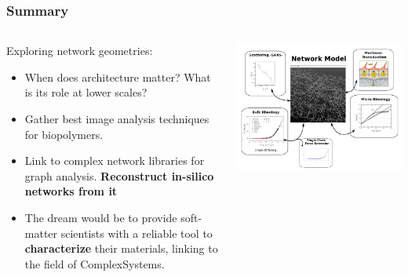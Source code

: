 \documentclass[9pt]{beamer}
\begin{document}
\begin{frame}
  \frametitle{Summary}
  \begin{columns}[onlytextwidth]
      \begin{alertblock}{Exploring network geometries:}
          \begin{itemize}
              \item When does architecture matter? What is its role at lower scales?
              \item Gather best image analysis techniques for biopolymers.
              \item Link to complex network libraries for graph analysis. \textbf{Reconstruct in-silico networks from it}
              \item \alert{The dream} would be to provide soft-matter scientists with a reliable tool to \textbf{characterize} their materials, linking to the field of ComplexSystems.
          \end{itemize}
      \end{alertblock}
        \centering\includegraphics[width=\textwidth]{./Figures/network_model_fig.png}
  \end{columns}
\end{frame}
\end{document}
